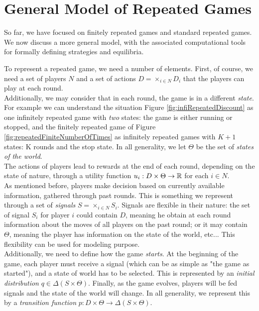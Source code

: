 \section{General Model of Repeated Games}
\label{sec:GenMod}


So far, we have focused on finitely repeated games and standard repeated games. We now discuss a more general model, with the associated computational tools for formally defining strategies and equilibria.


To represent a repeated game, we need a number of elements. First, of course, we need a set of players $N$ and a set of actions $D = \times_{i \in N} D_i$ that the players can play at each round.\\ Additionally, we may consider that in each round, the game is in a different \emph{state}. For example we can understand the situation Figure \ref{fig:infiRepeatedDiscount} as one infinitely repeated game with \emph{two} states: the game is either running or stopped, and the finitely repeated game of Figure \ref{fig:repeatedFiniteNumberOfTimes} as infinitely repeated games with $K+1$ states: K rounds and the stop state.
In all generality, we let $\Theta$ be the set of \emph{states of the world}. \\
The actions of players lead to rewards at the end of each round, depending on the state of nature, through a utility function $u_i : D \times \Theta \rightarrow \mathbb{R}$ for each $i \in N$. \\
As mentioned before, players make decision based on currently available information, gathered through past rounds. This is something we represent through a set of \emph{signals} $S = \times_{i \in N} S_i.$
Signals are flexible in their nature: the set of signal $S_i$ for player $i$ could contain $D$, meaning he obtain at each round information about the moves of all players on the past round; or it may contain $\Theta$, meaning the player has information on the state of the world, etc... This flexibility can be used for modeling purpose.\\
Additionally, we need to define how the game \emph{starts}. At the beginning of the game, each player must receive a signal (which can be as simple as "the game as started"), and a state of world has to be selected.
This is represented by an \emph{initial distribution}
$ q \in \Delta(S \times \Theta).$
Finally, as the game evolves, players will be fed signals and the state of the world will change. In all generality, we represent this by a \emph{transition function}
$ p : D \times \Theta \rightarrow \Delta(S \times \Theta).$

